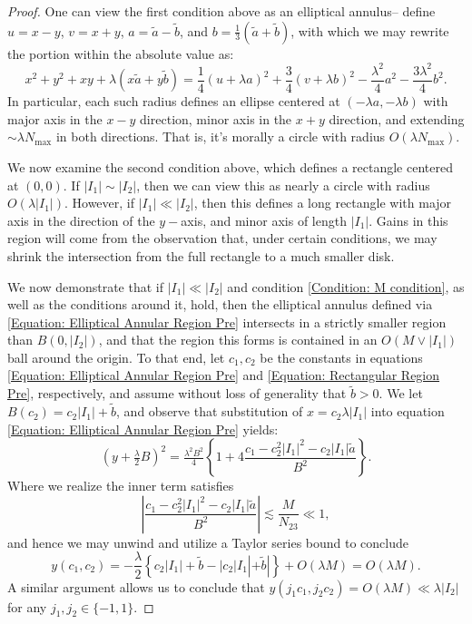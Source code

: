 \documentclass[12pt, letterpaper]{amsart}
\begin{document}
\begin{proof}
    One can view the first condition above as an elliptical annulus-- define $u = x-y$, $v = x+y$, $a = \tilde{a}-\tilde{b}$, and $b = \tfrac{1}{3}(\tilde{a}+\tilde{b})$, with which we may rewrite the portion within the absolute value as:
    \[
        x^2+y^2+xy+\lambda(x\tilde{a}+y\tilde{b}) = \frac{1}{4}\left(u+\lambda a \right)^2 + \frac{3}{4}\left(v + \lambda b\right)^2
        - \frac{\lambda^2}{4}a^2-\frac{3\lambda^2}{4}b^2.
    \]
    In particular, each such radius defines an ellipse centered at $(-\lambda a, -\lambda b)$ with major axis in the $x-y$ direction, minor axis in the $x+y$ direction, and extending $\sim \lambda N_{\max}$ in both directions. That is, it's morally a circle with radius $O(\lambda N_{\max})$. 

    We now examine the second condition above, which defines a rectangle centered at $(0,0)$. If $|I_1|\sim |I_2|$, then we can view this as nearly a circle with radius $O(\lambda |I_1|)$. However, if $|I_1|\ll |I_2|$, then this defines a long rectangle with major axis in the direction of the $y-$axis, and minor axis of length $|I_1|$. Gains in this region will come from the observation that, under certain conditions, we may shrink the intersection from the full rectangle to a much smaller disk. 
    

    We now demonstrate that if $|I_1|\ll |I_2|$ and condition \eqref{Condition: M condition}, as well as the conditions around it, hold, then the elliptical annulus defined via \eqref{Equation: Elliptical Annular Region Pre} intersects in a strictly smaller region than $B(0,|I_2|)$, and that the region this forms is contained in an $O(M\vee |I_1|)$ ball around the origin. To that end, let $c_1, c_2$ be the constants in equations \eqref{Equation: Elliptical Annular Region Pre} and \eqref{Equation: Rectangular Region Pre}, respectively, and assume without loss of generality that $\tilde{b} > 0$. We let $B(c_2) = c_2|I_1|+\tilde{b}$, and observe that substitution of $x =  c_2\lambda|I_1|$ into equation \eqref{Equation: Elliptical Annular Region Pre} yields:
    \[
    (y+\tfrac{\lambda}{2}B)^2 = \tfrac{\lambda^2B^2}{4}\left\{1+4\frac{c_1-c_2^2|I_1|^2-c_2|I_1|\tilde{a}}{B^2}\right\}.
    \]
    Where we realize the inner term satisfies
    \[
    \left|\frac{c_1-c_2^2|I_1|^2-c_2|I_1|\tilde{a}}{B^2}\right|\lesssim \frac{M}{N_{23}}\ll 1,
    \]
    and hence we may unwind and utilize a Taylor series bound to conclude
    \[
y(c_1, c_2) = -\frac{\lambda}{2}\left\{c_2|I_1|+\tilde{b} - |c_2|I_1|+\tilde{b}|\right\} + O\left(\lambda M\right)
 = O\left(\lambda M\right).
    \]
    A similar argument allows us to conclude that $y(j_1c_1, j_2 c_2) = O(\lambda M)\ll \lambda |I_2|$ for any $j_1,j_2\in\{-1,1\}$. 
    

\end{proof}
\end{document}
